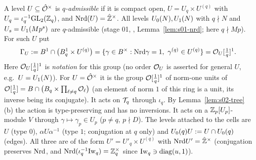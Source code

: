 \begin{definition}\label{def:s02-GU}
A level $U\subseteq\hat{\mathcal{O}}^\times$ is \emph{$q$-admissible} if it is compact open, $U=U_q\times U^{(q)}$ with
$U_q=\iota_q^{-1}\mathrm{GL}_2(\mathbb{Z}_q)$, and $\mathrm{Nrd}(U)=\hat{\mathbb{Z}}^\times$. All levels $U_0(N),U_1(N)$ with $q\nmid N$ and
$U_s=U_1(Mp^s)$ are $q$-admissible (stage 01, , Lemma~\ref{lem:s01-nrd}; here $q\nmid Mp$).
For such $U$ put
\[\Gamma_U:=B^1\cap\big(B^1_q\times U^{(q)}\big)=\{\gamma\in B^\times:\mathrm{Nrd}\gamma=1,\ \gamma^{(q)}\in U^{(q)}\}
=\mathcal{O}_U[\tfrac1q]^1.\]
Here $\mathcal{O}_U[\tfrac1q]^1$ is \emph{notation} for this group (no order $\mathcal{O}_U$ is asserted for general $U$, e.g.\
$U=U_1(N)$). For $U=\hat{\mathcal{O}}^\times$ it is the group $\mathcal{O}[\tfrac1q]^1$ of norm-one units of $\mathcal{O}[\tfrac1q]=B\cap\big(B_q\times\prod_{\ell\ne q}\mathcal{O}_\ell\big)$
(an element of norm $1$ of this ring is a unit, its inverse being its conjugate).
It acts on $\mathcal{T}_q$ through $\iota_q$. By Lemma~\ref{lem:s02-tree}(b) the action is type-preserving and has
no inversions. It acts on a $\mathbb{Z}_p[U_p]$-module $V$ through $\gamma\mapsto\gamma_p\in U_p$ ($p\ne q$, $p\nmid D$).
The levels attached to the cells are $U$ (type $0$), $\alpha U\alpha^{-1}$ (type $1$; conjugation at $q$
only) and $U_0(q)U:=U\cap U_0(q)$ (edges). All three are of the form $U'=U'_q\times U^{(q)}$ with
$\mathrm{Nrd} U'=\hat{\mathbb{Z}}^\times$ (conjugation preserves $\mathrm{Nrd}$, and $\mathrm{Nrd}(\iota_q^{-1}\mathrm{Iw}_q)=\mathbb{Z}_q^\times$ since $\mathrm{Iw}_q\ni\mathrm{diag}(u,1)$).
\stproved{}
\end{definition}
